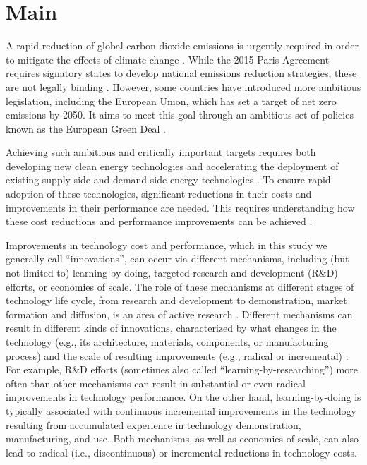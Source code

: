 \documentclass[parskip=full]{article}
\begin{document}
\section{Main}
\label{sec:intro}

A rapid reduction of global carbon dioxide emissions is urgently required in order to mitigate the effects of climate change \cite{Forster2019}. While the 2015 Paris Agreement requires signatory states to develop national emissions reduction strategies, these are not legally binding \cite{bodansky2016legal}. However, some countries have introduced more ambitious legislation, including the European Union, which has set a target of net zero emissions by 2050. It aims to meet this goal through an ambitious set of policies known as the European Green Deal \cite{eu2020green}.

Achieving such ambitious and critically important targets requires both developing new clean energy technologies \cite{iea2020cleanenergy} and accelerating the deployment of existing supply-side \cite{sinn2012green} and demand-side energy technologies \cite{rgeVorsatz2009}. To ensure rapid adoption of these technologies, significant reductions in their costs and improvements in their performance are needed. This requires understanding how these cost reductions and performance improvements can be achieved \cite{nemet2019solar,Stephan2021,kavlak2018evaluating,Ziegler2021}.

Improvements in technology cost and performance, which in this study we generally call “innovations”, can occur via different mechanisms, including (but not limited to) learning by doing\cite{WRIGHT_1936, Arrow_1962}, targeted research and development (R\&D) efforts, or economies of scale\cite{johansson2012global, iea2020perspectives}. The role of these mechanisms at different stages of technology life cycle, from research and development to demonstration, market formation and diffusion\cite{grubler2012policies}, is an area of active research \cite{kavlak2018evaluating,Ziegler2021}. Different mechanisms can result in different kinds of innovations, characterized by what changes in the technology (e.g., its architecture, materials, components, or manufacturing process) and the scale of resulting improvements (e.g., radical or incremental) \cite{Acemoglu_2022}. For example, R\&D efforts (sometimes also called “learning-by-researching”) \cite{Castelnuovo_2005} more often than other mechanisms can result in substantial or even radical improvements in technology performance. On the other hand, learning-by-doing is typically associated with continuous incremental improvements in the technology resulting from accumulated experience in technology demonstration, manufacturing, and use. Both mechanisms, as well as economies of scale, can also lead to radical (i.e., discontinuous) or incremental reductions in technology costs. 
\end{document}
